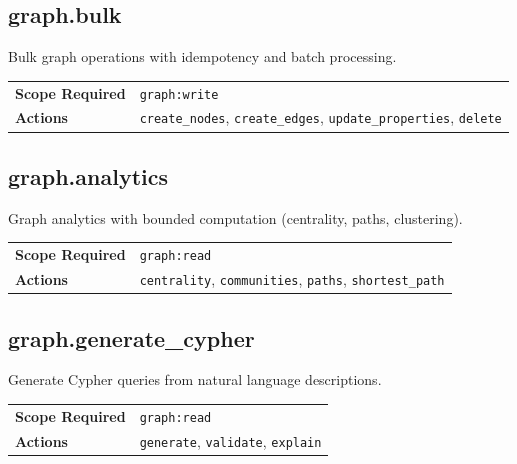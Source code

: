 \subsection{graph.bulk}

Bulk graph operations with idempotency and batch processing.

\begin{table}[ht]
\centering
\small
\begin{tabularx}{\textwidth}{lX}
    \hline
    \textbf{Scope Required} & \texttt{graph:write} \\
    \textbf{Actions} & \texttt{create\_nodes}, \texttt{create\_edges}, \texttt{update\_properties}, \texttt{delete} \\
    \hline
\end{tabularx}
\end{table}

\subsection{graph.analytics}

Graph analytics with bounded computation (centrality, paths, clustering).

\begin{table}[ht]
\centering
\small
\begin{tabularx}{\textwidth}{lX}
    \hline
    \textbf{Scope Required} & \texttt{graph:read} \\
    \textbf{Actions} & \texttt{centrality}, \texttt{communities}, \texttt{paths}, \texttt{shortest\_path} \\
    \hline
\end{tabularx}
\end{table}

\subsection{graph.generate\_cypher}

Generate Cypher queries from natural language descriptions.

\begin{table}[ht]
\centering
\small
\begin{tabularx}{\textwidth}{lX}
    \hline
    \textbf{Scope Required} & \texttt{graph:read} \\
    \textbf{Actions} & \texttt{generate}, \texttt{validate}, \texttt{explain} \\
    \hline
\end{tabularx}
\end{table}

